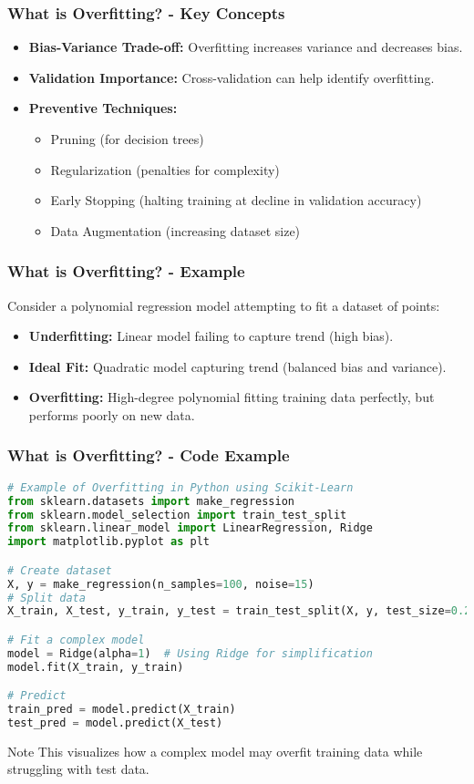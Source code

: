 \documentclass[aspectratio=169]{beamer}
\begin{document}
\begin{frame}[fragile]
    \frametitle{What is Overfitting? - Key Concepts}
    \begin{itemize}
        \item \textbf{Bias-Variance Trade-off:} Overfitting increases variance and decreases bias.
        \item \textbf{Validation Importance:} Cross-validation can help identify overfitting.
        \item \textbf{Preventive Techniques:} 
        \begin{itemize}
            \item Pruning (for decision trees)
            \item Regularization (penalties for complexity)
            \item Early Stopping (halting training at decline in validation accuracy)
            \item Data Augmentation (increasing dataset size)
        \end{itemize}
    \end{itemize}
\end{frame}

\begin{frame}[fragile]
    \frametitle{What is Overfitting? - Example}
    Consider a polynomial regression model attempting to fit a dataset of points:
    \begin{itemize}
        \item \textbf{Underfitting:} Linear model failing to capture trend (high bias).
        \item \textbf{Ideal Fit:} Quadratic model capturing trend (balanced bias and variance).
        \item \textbf{Overfitting:} High-degree polynomial fitting training data perfectly, but performs poorly on new data.
    \end{itemize}
\end{frame}

\begin{frame}[fragile]
    \frametitle{What is Overfitting? - Code Example}
    \begin{lstlisting}[language=Python]
# Example of Overfitting in Python using Scikit-Learn
from sklearn.datasets import make_regression
from sklearn.model_selection import train_test_split
from sklearn.linear_model import LinearRegression, Ridge
import matplotlib.pyplot as plt

# Create dataset
X, y = make_regression(n_samples=100, noise=15)
# Split data
X_train, X_test, y_train, y_test = train_test_split(X, y, test_size=0.2, random_state=42)

# Fit a complex model
model = Ridge(alpha=1)  # Using Ridge for simplification
model.fit(X_train, y_train)

# Predict
train_pred = model.predict(X_train)
test_pred = model.predict(X_test)
    \end{lstlisting}
    \begin{block}{Note}
        This visualizes how a complex model may overfit training data while struggling with test data.
    \end{block}
\end{frame}
\end{document}
